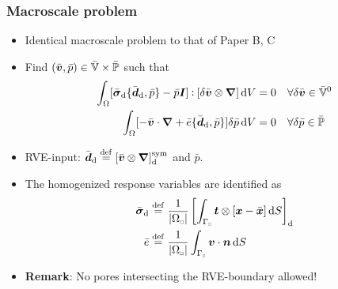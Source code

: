 \documentclass[11pt]{beamer} %
\renewcommand{\dev}{\mathrm{d}}
\newcommand{\volume}{|\Omega_\rve|}
\newcommand{\rve}{
  {\mathchoice
   {\mbox{\scalebox{0.67}{$\Box$}}}
   {\mbox{\scalebox{0.67}{$\Box$}}}
   {\mbox{\scalebox{0.5}{$\Box$}}}
   {\mbox{\scalebox{0.375}{$\Box$}}}
  }
}
\begin{document}
\begin{frame}
 \frametitle{Macroscale problem}
\begin{itemize}
 \item Identical macroscale problem to that of Paper B, C
\color{gray}
 \item Find $(\bar{\boldsymbol{v}}, \bar{p}) \in \bar{\mathbb{V}}\times\bar{\mathbb{P}}$ such that
 \begin{align*}
  \int_\Omega [{\bar{\ts\sigma}_\dev\{\bar{\ts d}_\dev, \bar{p}\}} - \bar{p}\ts I]\dprod[\delta\bar{\ta v}\outerp\diff]\dif V &= 0\quad \forall \delta\bar{\ta v} \in \bar{\set{V}}^0
\\
  \int_\Omega [-\bar{\ta v}\cdot\diff + {\bar{e}\{\bar{\ts d}_\dev, \bar{p}\}}]\delta\bar{p}\dif V &= 0\quad \forall \delta\bar{p} \in \bar{\set{P}}
 \end{align*}
 \item RVE-input: $\bar{\ts d}_\dev\defeq [\bar{\ta v}\outerp\diff]^\sym_\dev$ and $\bar{p}$.
 \item The homogenized response variables are identified as
 \begin{align*}
 \bar{\ts\sigma}_\dev &\defeq \frac{1}{\volume} \left[\int_{\Gamma_\rve} \ta t \outerp [\ta x-\bar{\ta x}]\dif S\right]_\dev
\\
 \bar{e} &\defeq \frac{1}{\volume} \int_{\Gamma_\rve} \ta v \cdot \ta n\dif S
 \end{align*}
\color{black}
 \item \textbf{Remark}: No pores intersecting the RVE-boundary allowed!
\end{itemize}
\end{frame}

\end{document}
